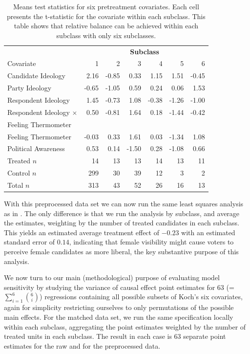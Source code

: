 \documentclass[11pt,titlepage]{article}
\newcommand{\MC}{\multicolumn}
\begin{document}
\begin{table}[t]
  \begin{center}
    \begin{tabular}{lrrrrrr}
      \hline
      & \MC{6}{c}{\bf Subclass} \\
      Covariate &  1 &  2 &  3 &  4 &  5 &  6 \\
      \hline
      Candidate Ideology & 2.16 & -0.85 & 0.33 & 1.15 & 1.51 & -0.45 \\
      Party Ideology & -0.65 & -1.05 & 0.59 & 0.24 & 0.06 & 1.53 \\
      Respondent Ideology & 1.45 & -0.73 & 1.08 & -0.38 & -1.26 & -1.00 \\
      Respondent Ideology $\times$ & 0.50 & -0.81 & 1.64 & 0.18 &
      -1.44 & -0.42 \\
      \hspace{0.1in} Feeling Thermometer \\
      Feeling Thermometer & -0.03 & 0.33 & 1.61 & 0.03 & -1.34 & 1.08 \\
      Political Awareness & 0.53 & 0.14 & -1.50 & 0.28 & -1.08 & 0.66
      \\ \hline
      Treated $n$& 14 & 13 & 13 & 14 & 13 & 11 \\
      Control $n$& 299 & 30 & 39 & 12 & 3 & 2 \\
      Total $n$  & 313 & 43 & 52 & 26 & 16 & 13 \\
      \hline
    \end{tabular}
    \caption{Means test statistics for six pretreatment covariates.
      Each cell presents the t-statistic for the covariate within each
      subclass.  This table shows that relative balance can be
      achieved within each subclass with only six subclasses.}
    \label{tb:kochxsub}
  \end{center}
\end{table}

With this preprocessed data set we can now run the same least squares
analysis as in \citet{Koch02}.  The only difference is that we run the
analysis by subclass, and average the estimates, weighting by the
number of treated candidates in each subclass.  This yields an
estimated average treatment effect of $-0.23$ with an estimated
standard error of $0.14$, indicating that female visibility might cause
voters to perceive female candidates as more liberal, the key
substantive purpose of this analysis.

We now turn to our main (methodological) purpose of evaluating model
sensitivity by studying the variance of causal effect point estimates
for 63 (=$\sum_{i=1}^6 {6 \choose i}$) regressions containing all
possible subsets of Koch's six covariates, again for simplicity
restricting ourselves to only permutations of the possible main
effects.  For the matched data set, we run the same specification
locally within each subclass, aggregating the point estimates weighted
by the number of treated units in each subclass.  The result in each
case is 63 separate point estimates for the raw and for the
preprocessed data.
\end{document}

